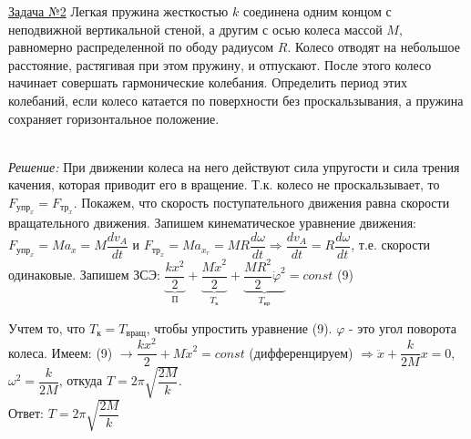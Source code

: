 \documentclass[a4paper,12pt]{article} %
\begin{document}
\underline{Задача №2} Легкая пружина жесткостью $k$ соединена одним концом с 
неподвижной вертикальной стеной, а другим с осью колеса массой $M$, равномерно
распределенной по ободу радиусом $R$. Колесо отводят на небольшое расстояние, 
растягивая при этом пружину, и отпускают. После этого колесо начинает совершать
гармонические колебания. Определить период этих колебаний, если колесо катается
по поверхности без проскальзывания, а пружина сохраняет горизонтальное положение.
\begin{figure}[h]
	\centering
	\vspace{-11ex}
	
\end{figure}
\begin{figure}[h]
	\centering
	\vspace{-17ex}
	
	\vspace{-5ex}
\end{figure}
\\ \textit{Решение:} При движении колеса на него действуют сила упругости и сила трения качения,
которая приводит его в вращение. Т.к. колесо не проскальзывает, то \\$F_{упр_x}=F_{тр_x}$. Покажем, что
скорость поступательного движения равна скорости вращательного движения. Запишем
кинематическое уравнение движения:\\
$F_{упр_x} = Ma_x = M\dfrac{dv_A}{dt}$ и $F_{тр_x} = Ma_{x_r}=MR\dfrac{d\omega}{dt} \Rightarrow \dfrac{dv_A}{dt} = R \dfrac{d \omega}{dt}$,
т.е. скорости одинаковые. Запишем ЗСЭ: $ \underbrace{\dfrac{kx^2}2}_{П} + 
\underbrace{\dfrac{M\dot x^2}2}_{T_к} + 
\underbrace{\dfrac{MR^2}2 \dot \varphi^2}_{T_{вр}} = const $ \hfill (9)

Учтем то, что $T_к = T_{вращ}$, чтобы упростить уравнение (9). $\varphi$ - это
угол поворота колеса. Имеем: (9) $\rightarrow \dfrac{kx^2}2 + M\dot x^2 = const$
(дифференцируем) $\Rightarrow \ddot x + \dfrac{k}{2M} x=0$, $\omega^2=\dfrac{k}{2M}$, откуда
$T=2\pi\sqrt{\dfrac{2M}{k}}$.\\
Ответ: $T=2\pi\sqrt{\dfrac{2M}{k}}$
 
\end{document}
